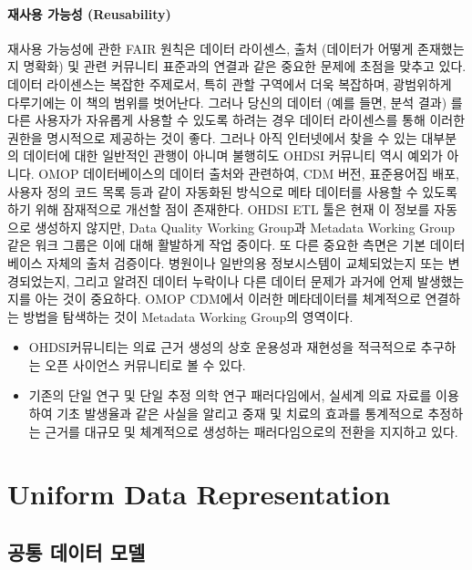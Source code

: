 \documentclass[11pt]{book}
\theoremstyle{definition}
\theoremstyle{definition}
\theoremstyle{definition}
\theoremstyle{remark}
\let\BeginKnitrBlock\begin \let\EndKnitrBlock\end
\begin{document}
\subsection{재사용 가능성 (Reusability)}\label{--reusability}

재사용 가능성에 관한 FAIR 원칙은 데이터 라이센스, 출처 (데이터가 어떻게
존재했는지 명확화) 및 관련 커뮤니티 표준과의 연결과 같은 중요한 문제에
초점을 맞추고 있다. 데이터 라이센스는 복잡한 주제로서, 특히 관할
구역에서 더욱 복잡하며, 광범위하게 다루기에는 이 책의 범위를 벗어난다.
그러나 당신의 데이터 (예를 들면, 분석 결과) 를 다른 사용자가 자유롭게
사용할 수 있도록 하려는 경우 데이터 라이센스를 통해 이러한 권한을
명시적으로 제공하는 것이 좋다. 그러나 아직 인터넷에서 찾을 수 있는
대부분의 데이터에 대한 일반적인 관행이 아니며 불행히도 OHDSI 커뮤니티
역시 예외가 아니다. OMOP 데이터베이스의 데이터 출처와 관련하여, CDM
버전, 표준용어집 배포, 사용자 정의 코드 목록 등과 같이 자동화된 방식으로
메타 데이터를 사용할 수 있도록 하기 위해 잠재적으로 개선할 점이
존재한다. OHDSI ETL 툴은 현재 이 정보를 자동으로 생성하지 않지만, Data
Quality Working Group과 Metadata Working Group 같은 워크 그룹은 이에
대해 활발하게 작업 중이다. 또 다른 중요한 측면은 기본 데이터베이스
자체의 출처 검증이다. 병원이나 일반의용 정보시스템이 교체되었는지 또는
변경되었는지, 그리고 알려진 데이터 누락이나 다른 데이터 문제가 과거에
언제 발생했는지를 아는 것이 중요하다. OMOP CDM에서 이러한 메타데이터를
체계적으로 연결하는 방법을 탐색하는 것이 Metadata Working Group의
영역이다.

\BeginKnitrBlock{rmdsummary}
\begin{itemize}
\item
  OHDSI커뮤니티는 의료 근거 생성의 상호 운용성과 재현성을 적극적으로
  추구하는 오픈 사이언스 커뮤니티로 볼 수 있다.
\item
  기존의 단일 연구 및 단일 추정 의학 연구 패러다임에서, 실세계 의료
  자료를 이용하여 기초 발생율과 같은 사실을 알리고 중재 및 치료의 효과를
  통계적으로 추정하는 근거를 대규모 및 체계적으로 생성하는
  패러다임으로의 전환을 지지하고 있다.
\end{itemize}
\EndKnitrBlock{rmdsummary}

\part{Uniform Data
Representation}\label{part-uniform-data-representation}

\chapter{공통 데이터 모델}\label{CommonDataModel}
\end{document}
